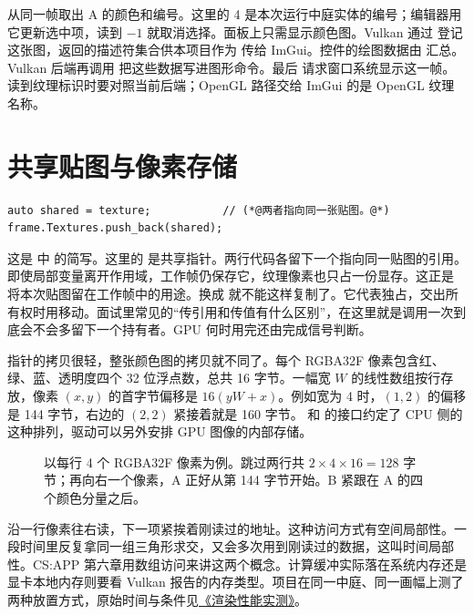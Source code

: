  从同一帧取出 A 的颜色和编号。这里的 4 是本次运行中庭实体的编号；编辑器用它更新选中项，读到 $-1$ 就取消选择。面板上只需显示颜色图。Vulkan 通过  登记这张图，返回的描述符集合供本项目作为  传给 ImGui。控件的绘图数据由  汇总。Vulkan 后端再调用  把这些数据写进图形命令。最后  请求窗口系统显示这一帧。读到纹理标识时要对照当前后端；OpenGL 路径交给 ImGui 的是 OpenGL 纹理名称。

\clearpage
\section{共享贴图与像素存储}
\begin{lstlisting}
auto shared = texture;           // (*@两者指向同一张贴图。@*)
frame.Textures.push_back(shared);
\end{lstlisting}
这是  中  的简写。这里的  是共享指针。两行代码各留下一个指向同一贴图的引用。即使局部变量离开作用域，工作帧仍保存它，纹理像素也只占一份显存。这正是  将本次贴图留在工作帧中的用途。换成  就不能这样复制了。它代表独占，交出所有权时用移动。面试里常见的“传引用和传值有什么区别”，在这里就是调用一次到底会不会多留下一个持有者。GPU 何时用完还由完成信号判断。

指针的拷贝很轻，整张颜色图的拷贝就不同了。每个 RGBA32F 像素包含红、绿、蓝、透明度四个 32 位浮点数，总共 16 字节。一幅宽 $W$ 的线性数组按行存放，像素 $(x,y)$ 的首字节偏移是 $16(yW+x)$。例如宽为 4 时，$(1,2)$ 的偏移是 144 字节，右边的 $(2,2)$ 紧接着就是 160 字节。 和  的接口约定了 CPU 侧的这种排列，驱动可以另外安排 GPU 图像的内部存储。

\begin{figure}[H]\centering

\caption{以每行 4 个 RGBA32F 像素为例。跳过两行共 $2\times4\times16=128$ 字节；再向右一个像素，A 正好从第 144 字节开始。B 紧跟在 A 的四个颜色分量之后。}
\end{figure}

沿一行像素往右读，下一项紧挨着刚读过的地址。这种访问方式有空间局部性。一段时间里反复拿同一组三角形求交，又会多次用到刚读过的数据，这叫时间局部性。CS:APP 第六章用数组访问来讲这两个概念。计算缓冲实际落在系统内存还是显卡本地内存则要看 Vulkan 报告的内存类型。项目在同一中庭、同一画幅上测了两种放置方式，原始时间与条件见\href{run:Redflag-Rendering-Performance.pdf}{《渲染性能实测》}。

